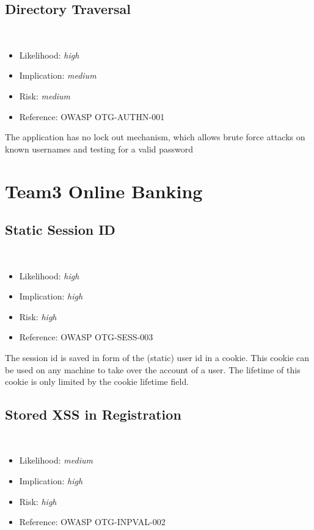 \documentclass[headsepline,footsepline,footinclude=false,oneside,fontsize=11pt,paper=a4,listof=totoc,bibliography=totoc]{scrbook} %
\begin{document}
\subsection{Directory Traversal} \
\begin{itemize}
	\item Likelihood: \textit{high}
	\item Implication: \textit{medium}
	\item Risk: \textit{medium}
	\item Reference: OWASP OTG-AUTHN-001
\end{itemize}
The application has no lock out mechanism, which allows brute force attacks on known usernames and testing
for a valid password



\section{Team3 Online Banking}

\subsection{Static Session ID}\label{Static Session ID}\
\begin{itemize}
	\item Likelihood: \textit{high}
	\item Implication: \textit{high}
	\item Risk: \textit{high}
	\item Reference: OWASP OTG-SESS-003
\end{itemize}

The session id is saved in form of the (static) user id in a cookie. This cookie can be used on any machine
to take over the account of a user. The lifetime of this cookie is only limited by the cookie lifetime field.


\subsection{Stored XSS in Registration}\label{Stored XSS in Registration}\
\begin{itemize}
	\item Likelihood: \textit{medium}
	\item Implication: \textit{high}
	\item Risk: \textit{high}
	\item Reference: OWASP OTG-INPVAL-002
\end{itemize}
\end{document}
